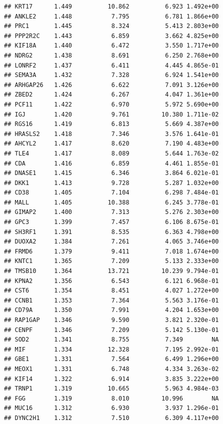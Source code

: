 \documentclass{article}\usepackage[]{graphicx}\usepackage[]{color}
\makeatletter
\newenvironment{kframe}{%
 \def\at@end@of@kframe{}%
 \ifinner\ifhmode%
  \def\at@end@of@kframe{\end{minipage}}%
  \begin{minipage}{\columnwidth}%
 \fi\fi%
 \def\FrameCommand##1{\hskip\@totalleftmargin \hskip-\fboxsep
 \colorbox{shadecolor}{##1}\hskip-\fboxsep
     \hskip-\linewidth \hskip-\@totalleftmargin \hskip\columnwidth}%
 \MakeFramed {\advance\hsize-\width
   \@totalleftmargin\z@ \linewidth\hsize
   \@setminipage}}%
 {\par\unskip\endMakeFramed%
 \at@end@of@kframe}
\newenvironment{knitrout}{}{} %
\makeatother
\begin{document}
\begin{knitrout}
\begin{kframe}
\begin{verbatim}
## KRT17      1.449          10.862          6.923 1.492e+00
## ANKLE2     1.448           7.795          6.781 1.866e+00
## PRC1       1.445           8.324          5.413 2.803e+00
## PPP2R2C    1.443           6.859          3.662 4.825e+00
## KIF18A     1.440           6.472          3.550 1.717e+00
## NDRG2      1.438           8.691          6.250 2.768e+00
## LONRF2     1.437           6.411          4.445 4.865e-01
## SEMA3A     1.432           7.328          6.924 1.541e+00
## ARHGAP26   1.426           6.622          7.091 3.126e+00
## ZBED2      1.424           6.267          4.047 1.361e+00
## PCF11      1.422           6.970          5.972 5.690e+00
## IGJ        1.420           9.761         10.380 1.711e-02
## RGS16      1.419           6.813          5.669 4.387e+00
## HRASLS2    1.418           7.346          3.576 1.641e-01
## AHCYL2     1.417           8.620          7.190 4.483e+00
## TLE4       1.417           8.089          5.644 1.763e-02
## CDA        1.416           6.859          4.461 1.855e-01
## DNASE1     1.415           6.346          3.864 6.021e-01
## DKK1       1.413           9.728          5.287 1.032e+00
## CD38       1.405           7.104          6.298 7.484e-01
## MALL       1.405          10.388          6.245 3.778e-01
## GIMAP2     1.400           7.313          5.276 2.303e+00
## GPC3       1.399           7.457          6.106 8.675e-01
## SH3RF1     1.391           8.535          6.363 4.798e+00
## DUOXA2     1.384           7.261          4.065 3.746e+00
## FRMD6      1.379           9.411          7.018 1.674e+00
## KNTC1      1.365           7.209          5.133 2.333e+00
## TMSB10     1.364          13.721         10.239 9.794e-01
## KPNA2      1.356           6.543          6.121 6.968e-01
## CST6       1.354           8.451          4.027 1.272e+00
## CCNB1      1.353           7.364          5.563 3.176e-01
## CD79A      1.350           7.991          4.204 1.653e+00
## RAP1GAP    1.346           9.590          3.821 2.320e-01
## CENPF      1.346           7.209          5.142 5.130e-01
## SOD2       1.341           8.755          7.349        NA
## MIF        1.334          12.328          7.195 2.992e-01
## GBE1       1.331           7.564          6.499 1.296e+00
## MEOX1      1.331           6.748          4.334 3.263e-02
## KIF14      1.322           6.914          3.835 3.222e+00
## TRNP1      1.319          10.665          5.963 4.984e-03
## FGG        1.319           8.010         10.996        NA
## MUC16      1.312           6.930          3.937 1.296e-01
## DYNC2H1    1.312           7.510          6.309 4.117e+00

\end{verbatim}
\end{kframe}
\end{knitrout}
\end{document}
